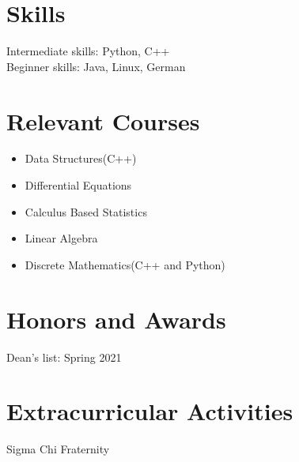 \documentclass{res}
\begin{document}
\begin{resume}
\section{Skills}          
    Intermediate skills: Python, C++\\
    Beginner skills: Java, Linux, German
    
\section{Relevant Courses}
	\begin{itemize}
		\item Data Structures(C++)
		\item Differential Equations
		\item Calculus Based Statistics
		\item Linear Algebra
		\item Discrete Mathematics(C++ and Python)    
	\end{itemize}  
 
\section{Honors and Awards}          
    Dean's list: Spring 2021         
 
\section{Extracurricular Activities}     
    Sigma Chi Fraternity         
 
\end{resume}
\end{document}
